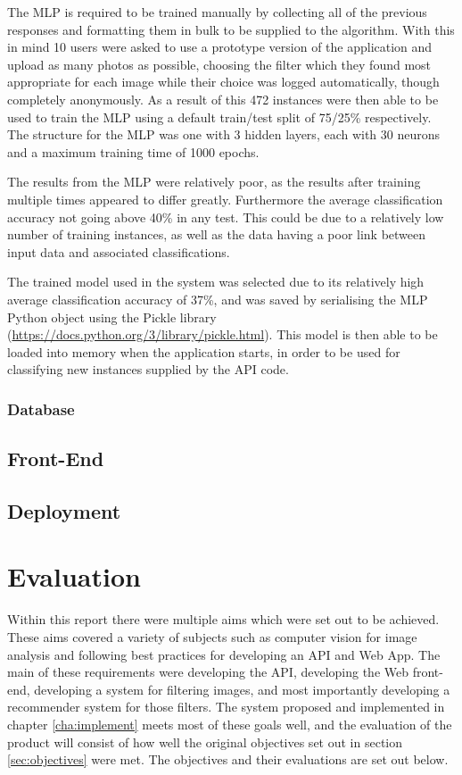 \documentclass[a4paper,12pt]{report}
\begin{document}
      The MLP is required to be trained manually by collecting all of the previous responses and formatting them in bulk to be supplied to the algorithm. With this in mind 10 users were asked to use a prototype version of the application and upload as many photos as possible, choosing the filter which they found most appropriate for each image while their choice was logged automatically, though completely anonymously. As a result of this 472 instances were then able to be used to train the MLP using a default train/test split of 75/25\% respectively. The structure for the MLP was one with 3 hidden layers, each with 30 neurons and a maximum training time of 1000 epochs.

      The results from the MLP were relatively poor, as the results after training multiple times appeared to differ greatly. Furthermore the average classification accuracy not going above 40\% in any test. This could be due to a relatively low number of training instances, as well as the data having a poor link between input data and associated classifications.

      The trained model used in the system was selected due to its relatively high average classification accuracy of 37\%, and was saved by serialising the MLP Python object using the Pickle library (\url{https://docs.python.org/3/library/pickle.html}). This model is then able to be loaded into memory when the application starts, in order to be used for classifying new instances supplied by the API code.

    \subsection{Database}

  \section{Front-End}

  \section{Deployment}

\chapter{Evaluation}
  Within this report there were multiple aims which were set out to be achieved. These aims covered a variety of subjects such as computer vision for image analysis and following best practices for developing an API and Web App. The main of these requirements were developing the API, developing the Web front-end, developing a system for filtering images, and most importantly developing a recommender system for those filters. The system proposed and implemented in chapter \ref{cha:implement} meets most of these goals well, and the evaluation of the product will consist of how well the original objectives set out in section \ref{sec:objectives} were met. The objectives and their evaluations are set out below.
\end{document}
